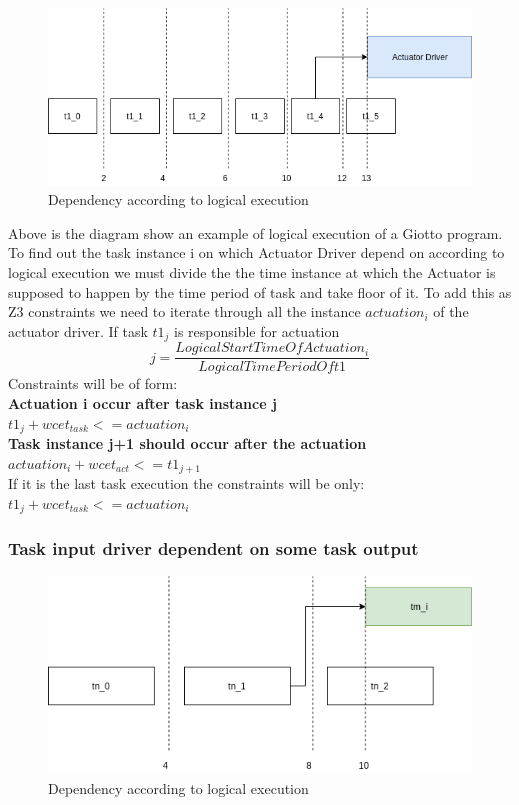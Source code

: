 \documentclass[16pt]{report}
\begin{document}
\begin{figure}[H]
\centering
\includegraphics[width=0.9\linewidth]{6act.png}
\caption{Dependency according to logical execution}
\end{figure}

Above is the diagram show an example of logical execution of a Giotto program. To find out the task instance i on which Actuator Driver depend on according to logical execution we must divide the the time instance at which the Actuator is supposed to happen by the time period of task and take floor of it.
To add this as Z3 constraints we need to iterate through all the instance $actuation_i$ of the actuator driver. If task $t1_j$ is responsible for actuation \\
\begin{equation}
    j = \frac{Logical Start Time Of Actuation_i}{Logical Time Period Of t1}
\end{equation}
Constraints will be of form:\\
\textbf{Actuation i occur after task instance j}\\
$ t1_j + wcet_{task} <= actuation_i$\\
\textbf{Task instance j+1 should occur after the actuation}\\
$ actuation_i + wcet_{act} <= t1_{j+1}$\\

\noindent
If it is the last task execution the constraints will be only:\\
$ t1_j + wcet_{task} <= actuation_i$\\


\subsubsection{Task input driver dependent on some task output}
\begin{figure}[H]
\centering
\includegraphics[width=0.9\linewidth]{7task.png}
\caption{Dependency according to logical execution}
\end{figure}
\end{document}
